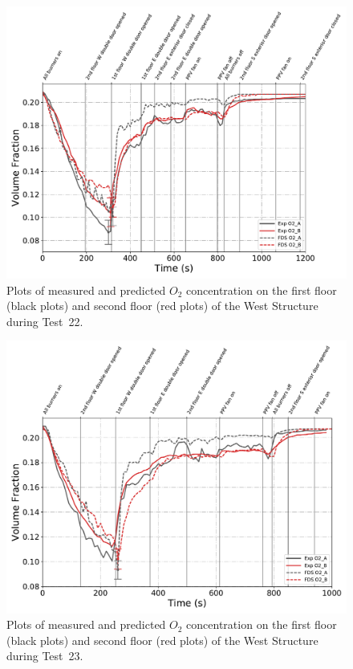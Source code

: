 \begin{figure}[!h]
	\centering
	\includegraphics[width=\columnwidth]{Figures/Plots/Validation/Gas_Concentration/Test_22_O2}
	\caption[Plots of measured and predicted $O_2$ concentration during Test~22.]{Plots of measured and predicted $O_2$ concentration on the first floor (black plots) and second floor (red plots) of the West Structure during Test~22.}
	\label{fig:Test22_O2}
\end{figure}

\begin{figure}[!h]
	\centering
	\includegraphics[width=\columnwidth]{Figures/Plots/Validation/Gas_Concentration/Test_23_O2}
	\caption[Plots of measured and predicted $O_2$ concentration during Test~23.]{Plots of measured and predicted $O_2$ concentration on the first floor (black plots) and second floor (red plots) of the West Structure during Test~23.}
	\label{fig:Test23_O2}
\end{figure}

